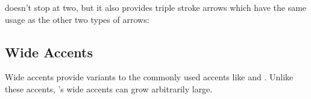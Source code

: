 \bigskip
\showcasearrow{}
\showcasearrow{}
\showcasearrow{}
\showcasearrow{}
\showcasearrow{}
\showcasearrow{}
\showcasearrow{}
\showcasearrow{}
\showcasearrow{}
\showcasearrow{}
\showcasearrow{}
\showcasearrow{}
\showcasearrow{}
\showcasearrow{}

\pdfMsym{} doesn't stop at two, but it also provides triple stroke arrows which have the same usage as the other two types
of arrows:

\bigskip
\showcasearrow{}
\showcasearrow{}
\showcasearrow{}

\vfill\eject
\subsection{Wide Accents}
Wide accents provide variants to the commonly used accents like \macroname\widehat{} and \macroname\widetilde.
Unlike these accents, \pdfMsym's wide accents can grow arbitrarily large.

